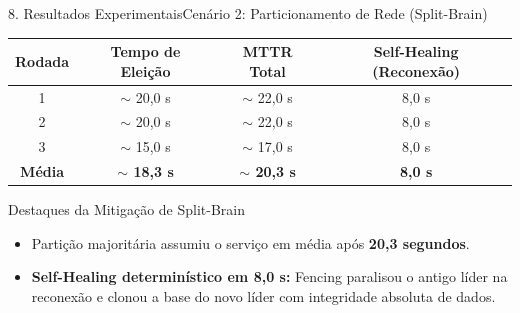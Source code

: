 \documentclass[aspectratio=169,10pt]{beamer}
\begin{document}
\begin{frame}{8. Resultados Experimentais}{Cenário 2: Particionamento de Rede (Split-Brain)}
  \begin{table}
    \centering
    \small
    \begin{tabular}{cccc}
      \toprule
      \textbf{Rodada} & \textbf{Tempo de Eleição} & \textbf{MTTR Total} & \textbf{Self-Healing (Reconexão)} \\
      \midrule
      1 & $\sim$ 20,0 s & $\sim$ 22,0 s & 8,0 s \\
      2 & $\sim$ 20,0 s & $\sim$ 22,0 s & 8,0 s \\
      3 & $\sim$ 15,0 s & $\sim$ 17,0 s & 8,0 s \\
      \midrule
      \textbf{Média} & \textbf{$\sim$ 18,3 s} & \textbf{$\sim$ 20,3 s} & \textbf{8,0 s} \\
      \bottomrule
    \end{tabular}
  \end{table}
  \vspace{-0.5em}
  \begin{exampleblock}{Destaques da Mitigação de Split-Brain}
    \begin{itemize}
      \item Partição majoritária assumiu o serviço em média após \textbf{20,3 segundos}.
      \item \textbf{Self-Healing determinístico em 8,0 s:} Fencing paralisou o antigo líder na reconexão e clonou a base do novo líder com integridade absoluta de dados.
    \end{itemize}
  \end{exampleblock}
\end{frame}
\end{document}
